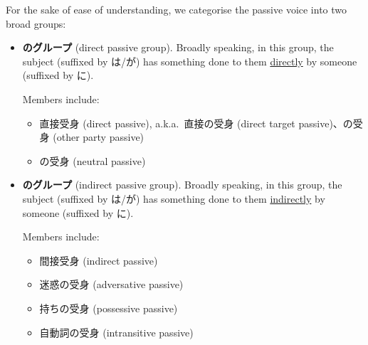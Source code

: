 \documentclass[../nihongo-gakushuu-kyouzai.tex]{subfiles}
\begin{document}
For the sake of ease of understanding, we categorise the passive voice into two broad groups:
\begin{itemize}
    \item \textbf{のグループ} (direct passive group). Broadly speaking, in this group, the subject (suffixed by は/が) has something done to them \ul{directly} by someone (suffixed by に).

    Members include:
    \begin{itemize}
        \item 直接受身 (direct passive), a.k.a.\ 直接の受身 (direct target passive)、の受身 (other party passive)


        \item {}の受身 (neutral passive)
    \end{itemize}

    \item \textbf{のグループ} (indirect passive group). Broadly speaking, in this group, the subject (suffixed by は/が) has something done to them \ul{indirectly} by someone (suffixed by に).

    Members include:
    \begin{itemize}
        \item 間接受身 (indirect passive)


        \item 迷惑の受身 (adversative passive)
        \item 持ちの受身 (possessive passive)


        \item 自動詞の受身 (intransitive passive)

    \end{itemize}
\end{itemize}
\end{document}
